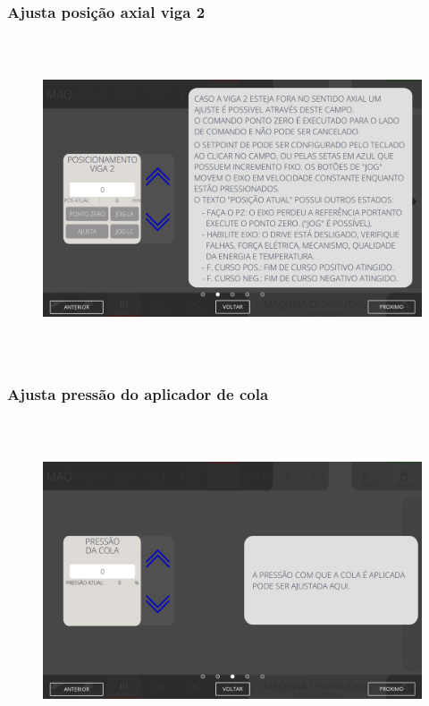 \newpage
\thispagestyle{fancy}
\vspace*{40 pt}
\subsubsection{\small{Ajusta posição axial viga 2}}
\vspace*{\fill}
\begin{figure}[h]
  \centering
  \includegraphics[width=576px,height=360px]{src/imagesFlexo/07-fold/settings/e-2.png}
\end{figure}
\vspace*{\fill}

\newpage
\thispagestyle{fancy}
\vspace*{40 pt}
\subsubsection{\small{Ajusta pressão do aplicador de cola}}
\vspace*{\fill}
\begin{figure}[h]
  \centering
  \includegraphics[width=576px,height=360px]{src/imagesFlexo/07-fold/settings/e-3.png}
\end{figure}
\vspace*{\fill}

